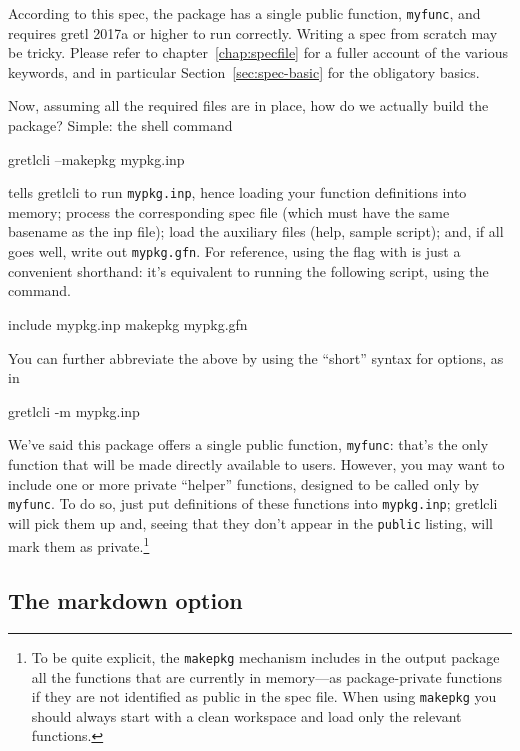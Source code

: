 \documentclass[oneside]{book}
\begin{document}
According to this spec, the package has a single public function,
\texttt{myfunc}, and requires gretl 2017a or higher to run
correctly. Writing a \textsf{spec} from scratch may be tricky. Please
refer to chapter~\ref{chap:specfile} for a fuller account of the
various keywords, and in particular Section~\ref{sec:spec-basic} for
the obligatory basics.

Now, assuming all the required files are in place, how do we actually
build the package? Simple: the shell command
%
\begin{code}
gretlcli --makepkg mypkg.inp
\end{code}
%
tells \textsf{gretlcli} to run \texttt{mypkg.inp}, hence loading your
function definitions into memory; process the corresponding
\textsf{spec} file (which must have the same basename as the
\textsf{inp} file); load the auxiliary files (help, sample script);
and, if all goes well, write out \texttt{mypkg.gfn}. For reference,
using the  flag with  is just a
convenient shorthand: it's equivalent to running the following script,
using the  command.
%
\begin{code}
include mypkg.inp
makepkg mypkg.gfn
\end{code}
You can further abbreviate the above by using the ``short'' syntax for
options, as in
\begin{code}
gretlcli -m mypkg.inp
\end{code}

We've said this package offers a single public function,
\texttt{myfunc}: that's the only function that will be made directly
available to users. However, you may want to include one or more
private ``helper'' functions, designed to be called only by
\texttt{myfunc}. To do so, just put definitions of these functions
into \texttt{mypkg.inp}; \textsf{gretlcli} will pick them up and,
seeing that they don't appear in the \texttt{public} listing, will
mark them as private.\footnote{To be quite explicit, the
  \texttt{makepkg} mechanism includes in the output package all the
  functions that are currently in memory---as package-private
  functions if they are not identified as public in the \textsf{spec}
  file. When using \texttt{makepkg} you should always start with a
  clean workspace and load only the relevant functions.}

\subsection{The markdown option}
\label{sec:md}
\end{document}
